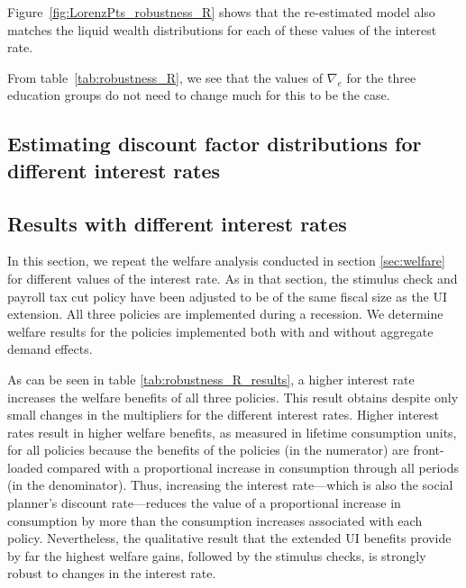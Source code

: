 \documentclass[\PathToRoot/\ProjectName]{subfiles}
\begin{document}
Figure~\ref{fig:LorenzPts_robustness_R} shows that the re-estimated model also matches the liquid wealth distributions for each of these values of the interest rate.



From table~\ref{tab:robustness_R}, we see that the values of $\nabla_e$ for the three education groups do not need to change much for this to be the case.

\subsection*{Estimating discount factor distributions for different interest rates}
\whenintegrated{\label{app:DF_R}} 

\subsection*{Results with different interest rates}
\whenintegrated{\label{sec:robust_R_results}} 

In this section, we repeat the welfare analysis conducted in section \ref{sec:welfare} for different values of the interest rate.
As in that section, the stimulus check and payroll tax cut policy have been adjusted to be of the same fiscal size as the UI extension.
All three policies are implemented during a recession.
We determine welfare results for the policies implemented both with and without aggregate demand effects.

As can be seen in table \ref{tab:robustness_R_results}, a higher interest rate increases the welfare benefits of all three policies.
This result obtains despite only small changes in the multipliers for the different interest rates.
Higher interest rates result in higher welfare benefits, as measured in lifetime consumption units, for all policies because the benefits of the policies (in the numerator) are front-loaded compared with a proportional increase in consumption through all periods (in the denominator).
Thus, increasing the interest rate---which is also the social planner's discount rate---reduces the value of a proportional increase in consumption by more than the consumption increases associated with each policy.
Nevertheless, the qualitative result that the extended UI benefits provide by far the highest welfare gains, followed by the stimulus checks, is strongly robust to changes in the interest rate.
\end{document}
